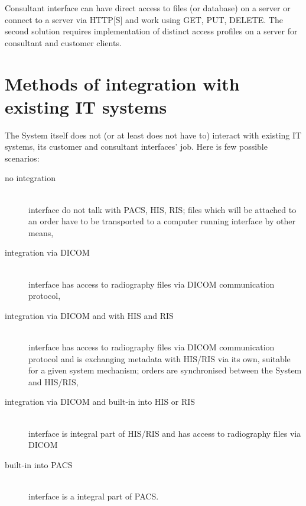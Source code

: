 \documentclass[a4paper]{article}
\begin{document}
Consultant interface can have direct access to files (or database) on a server or connect
to a server via HTTP[S] and work using GET, PUT, DELETE. The second solution requires
implementation of distinct access profiles on a server for consultant and customer
clients.

\section{Methods of integration with existing IT systems}

The System itself does not (or at least does not have to) interact with existing IT
systems, its customer and consultant interfaces' job. Here is few possible scenarios:
\begin{description}
  \item[no integration]\hfill\\ interface do not talk with PACS, HIS, RIS; files
  which will be attached to an order have to be transported to a computer running
  interface by other means,
  \item[integration via DICOM]\hfill\\ interface has access to radiography files
  via DICOM communication protocol,
  \item[integration via DICOM and with HIS and RIS]\hfill\\ interface has access to
  radiography files via DICOM communication protocol and is exchanging metadata with
  HIS/RIS via its own, suitable for a given system mechanism; orders are
  synchronised between the System and HIS/RIS,
  \item[integration via DICOM and built-in into HIS or RIS]\hfill\\
  interface is integral part of HIS/RIS and has access to radiography files via DICOM 
  \item[built-in into PACS]\hfill\\ interface is a integral part of PACS.
\end{description}
\end{document}
